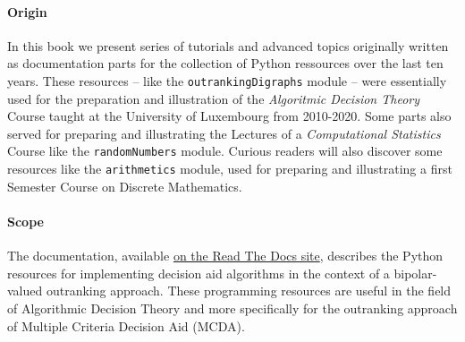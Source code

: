 %
%

\preface





\paragraph{Origin}

In this book we present series of tutorials and advanced topics originally written as documentation parts for the \Digraph collection of Python ressources over the last ten years. These \Digraph resources -- like the \texttt{outrankingDigraphs} module -- were essentially used for the preparation and illustration of the \emph{Algoritmic Decision Theory} Course taught at the University of Luxembourg from 2010-2020. Some parts also served for preparing and illustrating the Lectures of a \emph{Computational Statistics} Course like the \texttt{randomNumbers} module. Curious readers will also discover some resources like the \texttt{arithmetics} module, used for preparing and illustrating a first Semester Course on Discrete Mathematics.

\paragraph{Scope}

The \Digraph documentation, available \href{https://digraph3.readthedocs.io/en/latest/}{on the Read The Docs site}, describes the Python resources for implementing decision aid algorithms in the context of a bipolar-valued outranking approach. These programming resources are useful in the field of Algorithmic Decision Theory and more specifically for the outranking approach of Multiple Criteria Decision Aid (MCDA).

